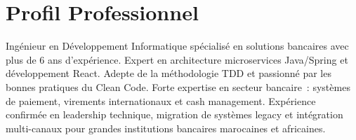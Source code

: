 \section*{Profil Professionnel}

Ingénieur en Développement Informatique spécialisé en solutions bancaires avec plus de 6 ans
d'expérience. Expert en architecture microservices Java/Spring et développement React. Adepte
de la méthodologie TDD et passionné par les bonnes pratiques du Clean Code. Forte expertise en
secteur bancaire~: systèmes de paiement, virements internationaux et cash management. Expérience
confirmée en leadership technique, migration de systèmes legacy et intégration multi-canaux pour
grandes institutions bancaires marocaines et africaines.
